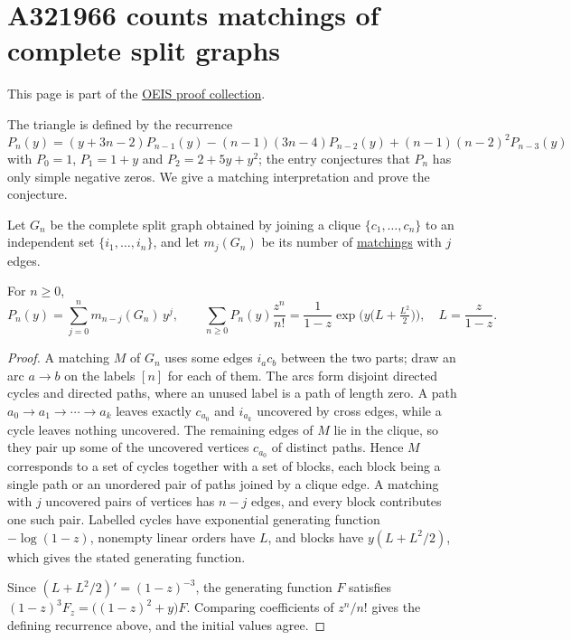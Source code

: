 

\section[oeisProofA321966]{A321966 counts matchings of complete split graphs}

This page is part of the \hyperref[oeisProofs]{OEIS proof collection}.

The triangle  is defined by the recurrence
\[
 P_n(y)=(y+3n-2)P_{n-1}(y)-(n-1)(3n-4)P_{n-2}(y)+(n-1)(n-2)^2P_{n-3}(y)
\]
with $P_0=1$, $P_1=1+y$ and $P_2=2+5y+y^2$; the entry conjectures that $P_n$ has
only simple negative zeros.  We give a matching interpretation and prove the
conjecture.

Let $G_n$ be the complete split graph obtained by joining a clique
$\{c_1,\dotsc,c_n\}$ to an independent set $\{i_1,\dotsc,i_n\}$, and let
$m_j(G_n)$ be its number of \hyperref[matchingPolynomial]{matchings} with $j$
edges.

\begin{theorem}
For $n\geq0$,
\[
 P_n(y)=\sum_{j=0}^{n} m_{n-j}(G_n)\,y^{j},
 \qquad
 \sum_{n\geq0}P_n(y)\frac{z^n}{n!}
 =\frac{1}{1-z}\exp\!\Big(y\big(L+\tfrac{L^2}{2}\big)\Big),
 \quad L=\frac{z}{1-z}.
\]
\end{theorem}

\begin{proof}
A matching $M$ of $G_n$ uses some edges $i_a c_b$ between the two parts; draw
an arc $a\to b$ on the labels $[n]$ for each of them.  The arcs form disjoint
directed cycles and directed paths, where an unused label is a path of length
zero.  A path $a_0\to a_1\to\dotsb\to a_k$ leaves exactly $c_{a_0}$ and
$i_{a_k}$ uncovered by cross edges, while a cycle leaves nothing uncovered.
The remaining edges of $M$ lie in the clique, so they pair up some of the
uncovered vertices $c_{a_0}$ of distinct paths.  Hence $M$ corresponds to a
set of cycles together with a set of blocks, each block being a single path
or an unordered pair of paths joined by a clique edge.  A matching with $j$
uncovered pairs of vertices has $n-j$ edges, and every block contributes one
such pair.  Labelled cycles have exponential generating function
$-\log(1-z)$, nonempty linear orders have $L$, and blocks have
$y(L+L^2/2)$, which gives the stated generating function.

Since $(L+L^2/2)'=(1-z)^{-3}$, the generating function $F$ satisfies
$(1-z)^3F_z=\big((1-z)^2+y\big)F$.  Comparing coefficients of $z^n/n!$ gives
the defining recurrence above, and the initial values agree.
\end{proof}

